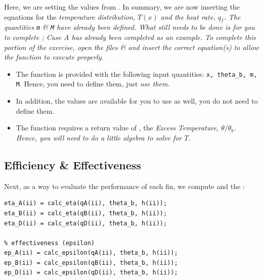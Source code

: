 \documentclass[11pt, letterpaper]{article}
\begin{document}
\n
Here, we are setting the values from . In summary, we are now inserting the equations for the \it{temperature distribution}, $T(x)$ and the \it{heat rate}, $q_f$.  The quantities \texttt{m} \& \texttt{M} have already been defined. What still needs to be done is for you to complete ; Case A has already been completed as an example.
\n
To complete this portion of the exercise, open the files  \&  and insert the correct equation(s) to allow the function to execute properly.
\n


\begin{center}
\begin{tcolorbox}[enhanced, width=14cm, size=tight, top=-2mm, colback=red!5, colframe=black!50!white, boxrule=0.25pt, boxsep=2mm]
\n
{\small
{}
\begin{itemize}
    \item The function is provided with the following input quantities: \texttt{x, theta\_b, m, M}. Hence, you  need to define them, just \it{use} them. 
    \item In addition, the  values are available for you to use as well, you do not need to define them. 
    \item The function requires a return value of ,  the \it{Excess Temperature, $\theta / \theta_b$}. Hence, you will need to do a little algebra to solve for $T$.
\end{itemize}
}
\end{tcolorbox}
\end{center}

\subsection{Efficiency \& Effectiveness}

Next, as a way to evaluate the performance of each fin, we compute  and the :

\begin{lstlisting}[numbers=none]
% efficiency (eta)
eta_A(ii) = calc_eta(qA(ii), theta_b, h(ii));
eta_B(ii) = calc_eta(qB(ii), theta_b, h(ii));
eta_D(ii) = calc_eta(qD(ii), theta_b, h(ii));

% effectiveness (epsilon)
ep_A(ii) = calc_epsilon(qA(ii), theta_b, h(ii));
ep_B(ii) = calc_epsilon(qB(ii), theta_b, h(ii));
ep_D(ii) = calc_epsilon(qD(ii), theta_b, h(ii));
\end{lstlisting}
\end{document}
